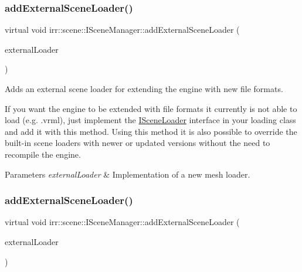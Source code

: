 \subsubsection{\texorpdfstring{add\+External\+Scene\+Loader()}{addExternalSceneLoader()}\hspace{0.1cm}{\footnotesize\ttfamily [1/2]}}
{\footnotesize\ttfamily virtual void irr\+::scene\+::\+I\+Scene\+Manager\+::add\+External\+Scene\+Loader (\begin{DoxyParamCaption}\item[{\hyperlink{classirr_1_1scene_1_1ISceneLoader}{I\+Scene\+Loader} $\ast$}]{external\+Loader }\end{DoxyParamCaption})\hspace{0.3cm}{\ttfamily [pure virtual]}}



Adds an external scene loader for extending the engine with new file formats. 

If you want the engine to be extended with file formats it currently is not able to load (e.\+g. .vrml), just implement the \hyperlink{classirr_1_1scene_1_1ISceneLoader}{I\+Scene\+Loader} interface in your loading class and add it with this method. Using this method it is also possible to override the built-\/in scene loaders with newer or updated versions without the need to recompile the engine. 
\begin{DoxyParams}{Parameters}
{\em external\+Loader} & Implementation of a new mesh loader. \\
\hline
\end{DoxyParams}
\mbox{\label{classirr_1_1scene_1_1ISceneManager_a8f0bc0221c4faaca80ac8f560ee424ef}} 
\subsubsection{\texorpdfstring{add\+External\+Scene\+Loader()}{addExternalSceneLoader()}\hspace{0.1cm}{\footnotesize\ttfamily [2/2]}}
{\footnotesize\ttfamily virtual void irr\+::scene\+::\+I\+Scene\+Manager\+::add\+External\+Scene\+Loader (\begin{DoxyParamCaption}\item[{\hyperlink{classirr_1_1scene_1_1ISceneLoader}{I\+Scene\+Loader} $\ast$}]{external\+Loader }\end{DoxyParamCaption})\hspace{0.3cm}{\ttfamily [pure virtual]}}



